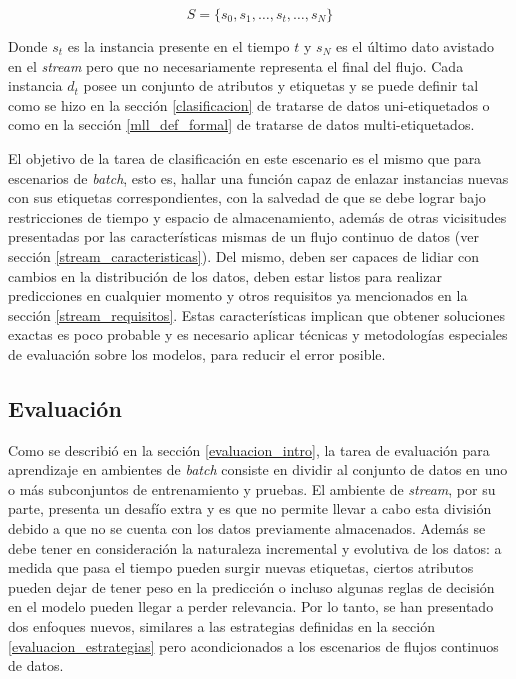 \begin{equation}
   S = \{s_{0}, s_{1}, \dots, s_{t}, \dots, s_{N}\}
\end{equation}

Donde $s_{t}$ es la instancia presente en el tiempo $t$ y $s_{N}$ es el último
dato avistado en el \textit{stream} pero que no necesariamente representa el
final del flujo. Cada instancia $d_{t}$ posee un conjunto de atributos y
etiquetas y se puede definir tal como se hizo en la sección \ref{clasificacion}
de tratarse de datos uni-etiquetados o como en la sección \ref{mll_def_formal}
de tratarse de datos multi-etiquetados. 

El objetivo de la tarea de clasificación en este escenario es el mismo que para
escenarios de \textit{batch}, esto es, hallar una función capaz de enlazar
instancias nuevas con sus etiquetas correspondientes, con la salvedad de que se
debe lograr bajo restricciones de tiempo y espacio de almacenamiento, además de
otras vicisitudes presentadas por las características mismas de un flujo
continuo de datos (ver sección \ref{stream_caracteristicas}). Del mismo, deben
ser capaces de lidiar con cambios en la distribución de los datos, deben estar
listos para realizar predicciones en cualquier momento y otros requisitos ya
mencionados en la sección \ref{stream_requisitos}. Estas características
implican que obtener soluciones exactas es poco probable y es necesario aplicar
técnicas y metodologías especiales de evaluación sobre los modelos, para reducir
el error posible.


\subsection{Evaluación}

Como se describió en la sección \ref{evaluacion_intro}, la tarea de evaluación
para aprendizaje en ambientes de \textit{batch} consiste en dividir al conjunto
de datos en uno o más subconjuntos de entrenamiento y pruebas.  El ambiente de
\textit{stream}, por su parte, presenta un desafío extra y es que no permite
llevar a cabo esta división debido a que no se cuenta con los datos previamente
almacenados. Además se debe tener en consideración la naturaleza incremental y
evolutiva de los datos: a medida que pasa el tiempo pueden surgir nuevas
etiquetas, ciertos atributos pueden dejar de tener peso en la predicción o
incluso algunas reglas de decisión en el modelo pueden llegar a perder
relevancia. Por lo tanto, se han presentado dos enfoques nuevos, similares a las
estrategias definidas en la sección \ref{evaluacion_estrategias} pero
acondicionados a los escenarios de flujos continuos de datos.

